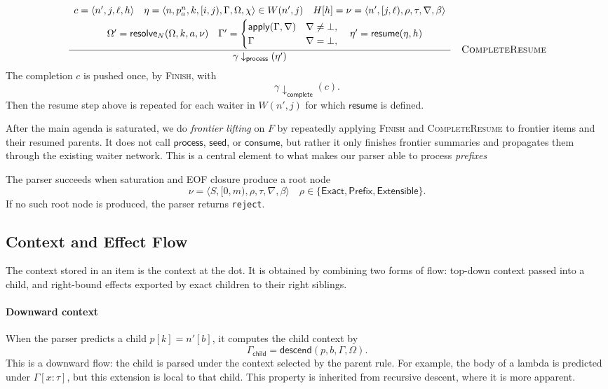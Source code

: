 \[
\frac{
\begin{array}{cr}
  c=\langle n',j,\ell,h\rangle
  \quad
  \eta=\langle n,p^n_a,k,[i,j),\Gamma,\Omega,\chi\rangle\in W(n',j)
  \quad
  H[h]=\nu=\langle n',[j,\ell),\rho,\tau,\nabla,\beta\rangle \\[0.25em]
  \quad
  \Omega'=\mathsf{resolve}_N(\Omega,k,a,\nu)  
  \quad
  \Gamma'=\begin{cases}
    \mathsf{apply}(\Gamma,\nabla) & \nabla\neq\bot, \\
    \Gamma & \nabla=\bot,
  \end{cases}
  \quad
  \eta'=\mathsf{resume}(\eta,h)
\end{array}
}{
  \gamma \downarrow_{\mathsf{process}}(\eta')
}
\quad\textsc{CompleteResume}
\]
The completion $c$ is pushed once, by \textsc{Finish}, with
\[
\gamma \downarrow_{\mathsf{complete}}(c).
\]
Then the resume step above is repeated for each waiter in $W(n',j)$ for which $\mathsf{resume}$ is defined.
\medskip

After the main agenda is saturated, we do \emph{frontier lifting} on $F$ by repeatedly applying \textsc{Finish} and \textsc{CompleteResume} to frontier items and their resumed parents. It does not call $\mathsf{process}$, $\mathsf{seed}$, or $\mathsf{consume}$, but rather it only finishes frontier summaries and propagates them through the existing waiter network. This is a central element to what makes our parser able to process \emph{prefixes}

The parser succeeds when saturation and EOF closure produce a root node
\[
\nu=\langle S,[0,m),\rho,\tau,\nabla,\beta\rangle
\quad
\rho\in\{\mathsf{Exact},\mathsf{Prefix},\mathsf{Extensible}\}.
\]
If no such root node is produced, the parser returns \texttt{reject}.

\subsection{Context and Effect Flow}
\label{sec:context-flow}

The context stored in an item is the context at the dot. It is obtained by combining two forms of flow: top-down context passed into a child, and right-bound effects exported by exact children to their right siblings.

\paragraph{Downward context}

When the parser predicts a child $p[k]=n'[b]$, it computes the child context by
\[
\Gamma_{\mathsf{child}}
=
\mathsf{descend}(p,b,\Gamma,\Omega).
\]
This is a downward flow: the child is parsed under the context selected by the parent rule. For example, the body of a lambda is predicted under $\Gamma[x:\tau]$, but this extension is local to that child. This property is inherited from recursive descent, where it is more apparent.

